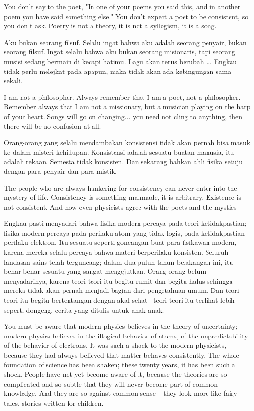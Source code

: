 \english
You don't say to the poet, "In one of your poems you said this, and in another poem you have said something else." You don't expect a poet to be consistent, so you don't ask. Poetry is not a theory, it is not a syllogism, it is a song.

\bahasa
Aku bukan seorang filsuf. Selalu ingat bahwa aku adalah seorang penyair, bukan seorang filsuf. Ingat selalu bahwa aku bukan seorang misionaris, tapi seorang musisi sedang bermain di kecapi hatimu. Lagu akan terus berubah ... Engkau tidak perlu melejkat pada apapun, maka tidak akan ada kebingungan sama sekali.

\english
I am not a philosopher. Always remember that I am a poet, not a philosopher. Remember always that I am not a missionary, but a musician playing on the harp of your heart. Songs will go on changing... you need not cling to anything, then there will be no confusion at all.

\bahasa
Orang-orang yang selalu mendambakan konsistensi tidak akan pernah bisa masuk ke dalam misteri kehidupan. Konsistensi adalah sesuatu buatan manusia, itu adalah rekaan. Semesta tidak konsisten. Dan sekarang bahkan ahli fisika setuju dengan para penyair dan para mistik.

\english
The people who are always hankering for consistency can never enter into the mystery of life. Consistency is something manmade, it is arbitrary. Existence is not consistent. And now even physicists agree with the poets and the mystics

\bahasa
Engkau pasti menyadari bahwa fisika modern percaya pada teori ketidakpastian; fisika modern percaya pada perilaku atom yang tidak logis, pada ketidakpastian perilaku elektron. Itu sesuatu seperti goncangan buat para fisikawan modern, karena mereka selalu percaya bahwa materi berperilaku konsisten. Seluruh landasan sains telah terguncang; dalam dua puluh tahun belakangan ini, itu benar-benar sesuatu yang sangat mengejutkan. Orang-orang belum menyadarinya, karena teori-teori itu begitu rumit dan begitu halus sehingga mereka tidak akan pernah menjadi bagian dari pengetahuan umum. Dan teori-teori itu begitu bertentangan dengan akal sehat-- teori-teori itu terlihat lebih seperti dongeng, cerita yang ditulis untuk anak-anak.

\english
You must be aware that modern physics believes in the theory of uncertainty; modern
physics believes in the illogical behavior of atoms, of the unpredictability of the behavior of electrons. It was such a shock to the modern physicists, because they had always believed that matter behaves consistently. The whole foundation of science has been shaken; these twenty years, it has been such a shock. People have not yet become aware of it, because the theories are so complicated and so subtle that they will never become part of common knowledge. And they are so against common sense -- they look more like fairy tales, stories written for children.

